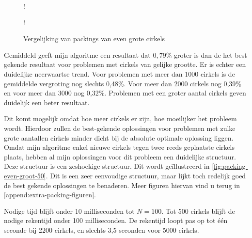 \documentclass[12pt,a4paper,oneside]{book}
\begin{document}
\begin {figure}
	\centering
	 {!} {
	}
	 {!} {
	}
	\caption{Vergelijking van packings van even grote cirkels}
	\label{fig:vergelijking-even-grote-cirkels}
\end {figure}

Gemiddeld geeft mijn algoritme een resultaat dat $0,79\%$ groter is dan de het best gekende resultaat voor problemen met cirkels van gelijke grootte.
Er is echter een duidelijke neerwaartse trend.
Voor problemen met meer dan 1000 cirkels is de gemiddelde vergroting nog slechts 0,48\%.
Voor meer dan 2000 cirkels nog 0,39\% en voor meer dan 3000 nog 0,32\%.
Problemen met een groter aantal cirkels geven duidelijk een beter resultaat.

Dit komt mogelijk omdat hoe meer cirkels er zijn, hoe moeilijker het probleem wordt.
Hierdoor zullen de best-gekende oplossingen voor problemen met zulke grote aantallen cirkels minder dicht bij de absolute optimale oplossing liggen.
Omdat mijn algoritme enkel nieuwe cirkels tegen twee reeds geplaatste cirkels plaats, hebben al mijn oplossingen voor dit probleem een duidelijke structuur.
Deze structuur is een zeshoekige structuur.
Dit wordt geïllustreerd in \autoref{fig:packing-even-groot-50}.
Dit is een zeer eenvoudige structuur, maar lijkt toch redelijk goed de best gekende oplossingen te benaderen.
Meer figuren hiervan vind u terug in \autoref{append:extra-packing-figuren}.

Nodige tijd blijft onder 10 milliseconden tot $N=100$.
Tot 500 cirkels blijft de nodige rekentijd onder 100 milliseconden.
De rekentijd loopt pas op tot één seconde bij 2200 cirkels, en slechts 3,5 seconden voor 5000 cirkels.
\end{document}
